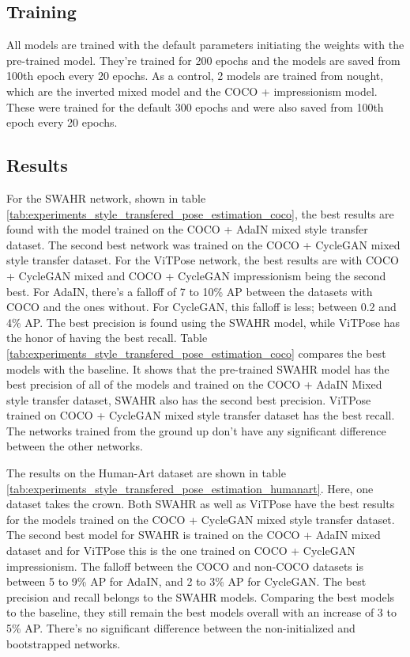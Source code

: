 \subsection{Training}
\label{sec:improvements_training_pose_estimation}
All models are trained with the default parameters initiating the weights with the pre-trained model.
They're trained for 200 epochs and the models are saved from 100th epoch every 20 epochs.
As a control, 2 models are trained from nought, which are the inverted mixed model and the COCO + impressionism model.
These were trained for the default 300 epochs and were also saved from 100th epoch every 20 epochs.

\subsection{Results}
\label{sec:improvements_results_pose_estimation}
For the SWAHR network, shown in table \ref{tab:experiments_style_transfered_pose_estimation_coco}, the best results are found with the model trained on the COCO + AdaIN mixed style transfer dataset.
The second best network was trained on the COCO + CycleGAN mixed style transfer dataset.
For the ViTPose network, the best results are with COCO + CycleGAN mixed and COCO + CycleGAN impressionism being the second best.
For AdaIN, there's a falloff of 7 to 10\% AP between the datasets with COCO and the ones without.
For CycleGAN, this falloff is less; between 0.2 and 4\% AP.
The best precision is found using the SWAHR model, while ViTPose has the honor of having the best recall.
Table \ref{tab:experiments_style_transfered_pose_estimation_coco} compares the best models with the baseline.
It shows that the pre-trained SWAHR model has the best precision of all of the models and trained on the COCO + AdaIN Mixed style transfer dataset, SWAHR also has the second best precision.
ViTPose trained on COCO + CycleGAN mixed style transfer dataset has the best recall.
The networks trained from the ground up don't have any significant difference between the other networks.

The results on the Human-Art dataset are shown in table \ref{tab:experiments_style_transfered_pose_estimation_humanart}.
Here, one dataset takes the crown.
Both SWAHR as well as ViTPose have the best results for the models trained on the COCO + CycleGAN mixed style transfer dataset.
The second best model for SWAHR is trained on the COCO + AdaIN mixed dataset and for ViTPose this is the one trained on COCO + CycleGAN impressionism.
The falloff between the COCO and non-COCO datasets is between 5 to 9\% AP for AdaIN, and 2 to 3\% AP for CycleGAN.
The best precision and recall belongs to the SWAHR models.
Comparing the best models to the baseline, they still remain the best models overall with an increase of 3 to 5\% AP.
There's no significant difference between the non-initialized and bootstrapped networks.

